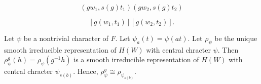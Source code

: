\documentclass[12pt]{article}
\begin{document}
\[\left(gw_1, s\left(g\right)t_1\right) \left(gw_2,
s\left(g\right)t_2 \right)\]

\[\left[g\left(w_1, t_1\right)\right] \left[g \left(w_2,
t_2 \right)\right].\]

Let $\psi$ be a nontrivial character of $F$. Let $\psi_{a}\left(t\right) =
\psi\left(at\right)$. Let $\rho_{\psi}$ be the unique smooth irreducible
representation of $H\left(W\right)$ with central chracter $\psi$. Then
$\rho_{\psi}^{g}\left(h\right) = \rho_{\psi}\left(g^{-1}h\right)$ is a smooth
irreducible representation of $H\left(W\right)$ with central chracter
$\psi_{s\left(b\right)}$. Hence, $\rho_{\psi}^{g} \cong
\rho_{\psi_{s\left(b\right)}}$.
\end{document}
